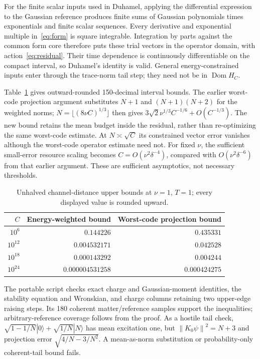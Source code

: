 \documentclass[11pt]{article}
\newcommand{\norm}[1]{\left\lVert#1\right\rVert}
\begin{document}
For the finite scalar inputs used in Duhamel, applying the differential
expression to the Gaussian reference produces finite sums of Gaussian
polynomials times exponentials and finite scalar sequences. Every derivative
and exponential multiple in~\eqref{eq:form} is square integrable.
Integration by parts against the common form core therefore puts these
trial vectors in the operator domain, with action~\eqref{eq:residual}.
Their time dependence is continuously differentiable on the compact
interval, so Duhamel's identity is valid. General energy-constrained inputs
enter through the trace-norm tail step; they need not be in
$\operatorname{Dom}H_C$.

Table~\ref{tab:bounds} gives outward-rounded 150-decimal interval bounds.
The earlier worst-code projection argument substitutes $N+1$ and
$(N+1)(N+2)$ for the weighted norms; $N=\lfloor(8\nu C)^{1/3}\rfloor$
then gives $3\sqrt2\nu^{1/3}C^{-1/6}+O(C^{-1/3})$.
The new bound retains the mean budget inside the residual, rather than
re-optimizing the same worst-code estimate. At $N\asymp\sqrt C$ its
constrained vector error vanishes although the worst-code operator
estimate need not. For fixed $\nu$, the sufficient small-error resource
scaling becomes $C=O(\nu^2\delta^{-4})$, compared with
$O(\nu^2\delta^{-6})$ from that earlier argument. These are sufficient
asymptotics, not necessary thresholds.

\begin{table}[htbp]
\centering
\caption{Unhalved channel-distance upper bounds at $\nu=1$, $T=1$;
every displayed value is rounded upward.}\label{tab:bounds}
\begin{tabular}{@{}rrr@{}}\toprule
$C$ & Energy-weighted bound & Worst-code projection bound\\\midrule
$10^6$ & $0.144226$ & $0.435331$\\
$10^{12}$ & $0.004532171$ & $0.042528$\\
$10^{18}$ & $0.000143292$ & $0.004244$\\
$10^{24}$ & $0.000004531258$ & $0.000424275$\\\bottomrule
\end{tabular}
\end{table}

The portable script checks exact charge and Gaussian-moment identities,
the stability equation and Wronskian, and charge columns retaining two
upper-edge raising steps. Its 180 coherent matter/reference samples support
the inequalities; arbitrary-reference coverage follows from the proof.
As a hostile tail check,
$\sqrt{1-1/N}|0\rangle+\sqrt{1/N}|N\rangle$ has mean excitation one,
but $\norm{K_0\psi}^2=N+3$ and projection error $\sqrt{4/N-3/N^2}$.
A mean-as-norm substitution or probability-only coherent-tail bound fails.
\end{document}
